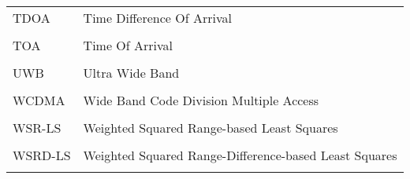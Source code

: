 \begin{longtable}[h]{l l}
\\
TDOA &  Time Difference Of Arrival \\
\\
TOA & Time Of Arrival \\
\\
UWB & Ultra Wide Band \\
\\
WCDMA & Wide Band Code Division Multiple Access \\
\\
WSR-LS & Weighted Squared Range-based Least Squares \\
\\
WSRD-LS & Weighted Squared Range-Difference-based Least Squares \\
\\
\end{longtable}
